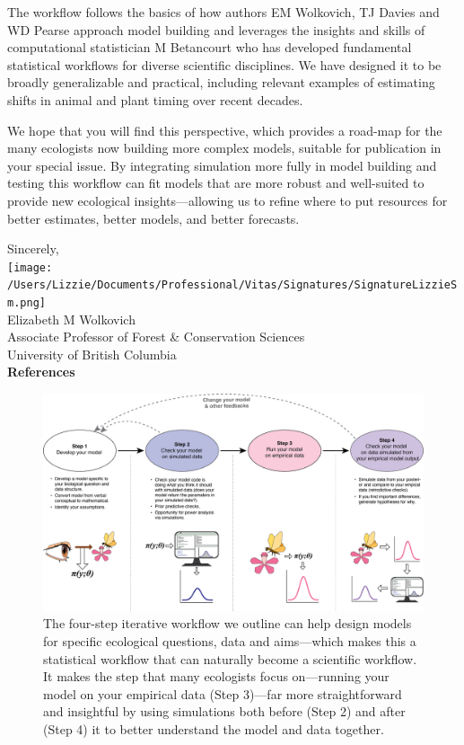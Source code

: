 \documentclass[11pt]{article}
\begin{document}
The workflow follows the basics of how authors EM Wolkovich, TJ Davies and WD Pearse approach model building and leverages the insights and skills of computational statistician M Betancourt who has developed fundamental statistical workflows for diverse scientific disciplines. We have designed it to be broadly generalizable and practical, including relevant examples of estimating shifts in animal and plant timing over recent decades. %

We hope that you will find this perspective, which provides a road-map for the many ecologists now building more complex models, suitable for publication in your special issue. By integrating simulation more fully in model building and testing this workflow can fit models that are more robust and well-suited to provide new ecological insights---allowing us to refine where to put resources for better estimates, better models, and better forecasts. %

Sincerely,\\

\texttt{[image: /Users/Lizzie/Documents/Professional/Vitas/Signatures/SignatureLizzieSm.png]} \\

Elizabeth M Wolkovich\\
Associate Professor of Forest \& Conservation Sciences\\ 
University of British Columbia\\

{\bf References}
\vspace{-8ex}



\vspace{5ex}

\begin{figure}[ht]
\centering
\noindent \includegraphics[width=1\textwidth]{..//figures/workflow.png}
\caption{The four-step iterative workflow we outline can help design models for specific ecological questions, data and aims---which makes this a statistical workflow that can naturally become a scientific workflow. It makes the step that many ecologists focus on---running your model on your empirical data (Step 3)---far more straightforward and insightful by using simulations both before (Step 2) and after (Step 4) it to better understand the model and data together.}
\label{fig:workflow}
\end{figure}
\end{document}
